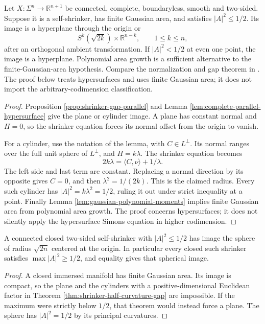 \begin{theorem}\label{thm:shrinker-half-curvature-gap}
Let $X:\Sigma^n\to\mathbb R^{n+1}$ be connected, complete, boundaryless, smooth and two-sided. Suppose it is a self-shrinker, has finite Gaussian area, and satisfies $|A|^2\leq1/2$. Its image is a hyperplane through the origin or
\[
 S^k(\sqrt{2k})\times\mathbb R^{n-k},\qquad 1\leq k\leq n,
\]
after an orthogonal ambient transformation. If $|A|^2<1/2$ at even one point, the image is a hyperplane. Polynomial area growth is a sufficient alternative to the finite-Gaussian-area hypothesis.
Compare the normalization and gap theorem in \cite{CL12}. The proof below treats hypersurfaces and uses finite Gaussian area; it does not import the arbitrary-codimension classification.
\end{theorem}
\begin{proof}
Proposition \ref{prop:shrinker-gap-parallel} and Lemma \ref{lem:complete-parallel-hypersurface} give the plane or cylinder image. A plane has constant normal and $H=0$, so the shrinker equation forces its normal offset from the origin to vanish.

For a cylinder, use the notation of the lemma, with $C\in L^\perp$. Its normal ranges over the full unit sphere of $L^\perp$, and $H=k\lambda$. The shrinker equation becomes
\[
 2k\lambda=\langle C,\nu\rangle+1/\lambda.
\]
The left side and last term are constant. Replacing a normal direction by its opposite gives $C=0$, and then $\lambda^2=1/(2k)$. This is the claimed radius. Every such cylinder has $|A|^2=k\lambda^2=1/2$, ruling it out under strict inequality at a point. Finally Lemma \ref{lem:gaussian-polynomial-moments} implies finite Gaussian area from polynomial area growth. The proof concerns hypersurfaces; it does not silently apply the hypersurface Simons equation in higher codimension.
\end{proof}

\begin{corollary}\label{cor:compact-shrinker-curvature-gap}
A connected closed two-sided self-shrinker with $|A|^2\leq1/2$ has image the sphere of radius $\sqrt{2n}$ centered at the origin. In particular every closed such shrinker satisfies $\max|A|^2\geq1/2$, and equality gives that spherical image.
\end{corollary}
\begin{proof}
A closed immersed manifold has finite Gaussian area. Its image is compact, so the plane and the cylinders with a positive-dimensional Euclidean factor in Theorem \ref{thm:shrinker-half-curvature-gap} are impossible. If the maximum were strictly below $1/2$, that theorem would instead force a plane. The sphere has $|A|^2=1/2$ by its principal curvatures.
\end{proof}

